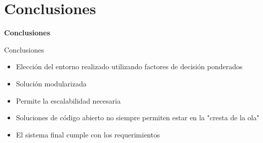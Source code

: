 \section{Conclusiones}
\begin{frame}
    \Huge
    \centering
    \textbf{Conclusiones}

\end{frame}

\begin{frame}{Conclusiones}
    \vspace{0cm}
    \begin{itemize}
        \item Elección del entorno realizado utilizando factores de decisión ponderados
        \item Solución modularizada
        \item Permite la escalabilidad necesaria
        \item Soluciones de código abierto no siempre permiten estar en la "cresta de la ola"
        \item El sistema final cumple con los requerimientos
    \end{itemize}



\end{frame}


